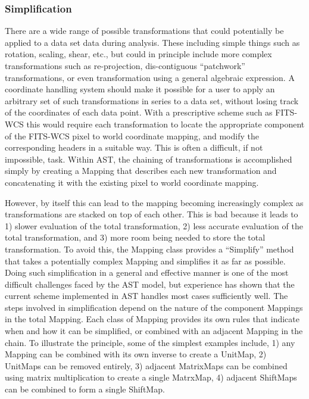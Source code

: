 \documentclass[final,authoryear,5p,times,twocolumn]{elsarticle}
\begin{document}
\subsubsection{Simplification}

There are a wide range of possible transformations that could
potentially be applied to a data set data during analysis. These
including simple things such as rotation, scaling, shear, etc., but
could in principle include more complex transformations such as
re-projection, dis-contiguous “patchwork” transformations, or even
transformation using a general algebraic expression.  A coordinate
handling system should make it possible for a user to apply an
arbitrary set of such transformations in series to a data set, without
losing track of the coordinates of each data point. With a
prescriptive scheme such as FITS-WCS this would require each
transformation to locate the appropriate component of the FITS-WCS
pixel to world coordinate mapping, and modify the corresponding
headers in a suitable way. This is often a difficult, if not
impossible, task. Within AST, the chaining of transformations is
accomplished simply by creating a Mapping that describes each new
transformation and concatenating it with the existing pixel to world
coordinate mapping.

However, by itself this can lead to the mapping becoming increasingly
complex as transformations are stacked on top of each other. This is
bad because it leads to 1) slower evaluation of the total
transformation, 2) less accurate evaluation of the total
transformation, and 3) more room being needed to store the total
transformation.  To avoid this, the Mapping class provides a
“Simplify” method that takes a potentially complex Mapping and
simplifies it as far as possible. Doing such simplification in a
general and effective manner is one of the most difficult challenges
faced by the AST model, but experience has shown that the current
scheme implemented in AST handles most cases sufficiently well. The
steps involved in simplification depend on the nature of the component
Mappings in the total Mapping. Each class of Mapping provides its own
rules that indicate when and how it can be simplified, or combined
with an adjacent Mapping in the chain. To illustrate the principle,
some of the simplest examples include, 1) any Mapping can be combined
with its own inverse to create a UnitMap, 2) UnitMaps can be removed
entirely, 3) adjacent MatrixMaps can be combined using matrix
multiplication to create a single MatrxMap, 4) adjacent ShiftMaps can
be combined to form a single ShiftMap.
\end{document}
